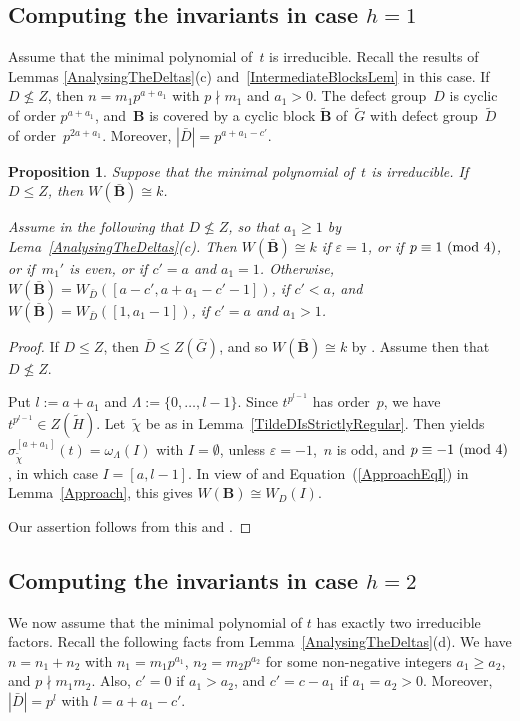 \documentclass[12pt]{amsart}
\newcommand{\bB}{{\mathbf{B}}}
\newtheorem{prop}[thm]{Proposition}
\theoremstyle{theorem}
\theoremstyle{definition}
\theoremstyle{remark}
\begin{document}
\addtocounter{subsection}{4}
\subsection{Computing the invariants in case $h = 1$}
Assume that the minimal polynomial of~$t$ is irreducible. Recall the results of 
Lemmas \ref{AnalysingTheDeltas}(c) and~\ref{IntermediateBlocksLem} in this case. 
If $D \not \leq Z$, then $n = m_1p^{a + a_1}$ with $p \nmid m_1$ and $a_1 > 0$. 
The defect group~$D$ is cyclic of order $p^{a+a_1}$, and~$\bB$ is covered by a 
cyclic block $\tilde{\bB}$ of~$\tilde{G}$ with defect group~$\tilde{D}$ of 
order~$p^{2a+a_1}$. Moreover, $|\bar{D}| = p^{a + a_1 - c'}$.

\addtocounter{thm}{1}
\begin{prop}
\label{Case1Prop}
Suppose that the minimal polynomial of~$t$ is irreducible. If $D \leq Z$, then
$W( \bar{\bB} ) \cong k$.

Assume in the following that $D \not \leq Z$, so that $a_1 \geq 1$ by
{\rm Lema~\ref{AnalysingTheDeltas}(c)}. Then $W( \bar{\bB} ) \cong k$
if $\varepsilon = 1$, or if $p \equiv 1\,\,(\mbox{\rm mod}\,\,4)$, or if~$m_1'$ 
is even, or if $c' = a$ and $a_1 = 1$. Otherwise, 
$W( \bar{\bB} ) = W_{\bar{D}}( [a - c', a + a_1 - c' - 1] )$, if $c' < a$,
and $W( \bar{\bB} ) = W_{\bar{D}}( [1, a_1 - 1] )$, if $c' = a$ and $a_1 > 1$.
\end{prop}
\begin{proof}
If $D \leq Z$, then $\bar{D} \leq Z( \bar{G} )$, and so
$W( \bar{\bB} ) \cong k$ by \cite[Lemma~$3.6$(b)]{HL24}. Assume then that
$D \not\leq Z$.

Put $l := a + a_1$ and $\Lambda := \{ 0, \ldots , l - 1\}$. Since $t^{p^{l -1}}$ 
has order~$p$, we have $t^{p^{l - 1}} \in Z( \tilde{H} )$. Let~$\tilde{\chi}$ be 
as in Lemma~\ref{TildeDIsStrictlyRegular}. Then \cite[Lemma~$4.1.3$]{HL25} 
yields $\sigma_{\tilde{\chi}}^{[a + a_1]}( t ) = \omega_{\Lambda}( I )$ with 
$I = \emptyset$, unless $\varepsilon = -1$,~$n$ is odd, and 
$p \equiv -1\,\,(\mbox{\rm mod}\,\,4)$, in which case $I = [a, l - 1]$. In view 
of \cite[Remark~$2.3.3$]{HL25} and 
Equation~(\ref{ApproachEqI}) in Lemma~\ref{Approach}, this gives 
$W( \bB ) \cong W_{D}( I )$.

Our assertion follows from this and \cite[Lemma~$2.4.2$(c)]{HL25}.
\end{proof}

\addtocounter{subsection}{1}
\subsection{Computing the invariants in case $h = 2$}
We now assume that the minimal polynomial of $t$ has exactly two irreducible 
factors. Recall the following facts from Lemma~\ref{AnalysingTheDeltas}(d). We
have 
$n = n_1 + n_2$ with $n_1 = m_1p^{a_1}$, $n_2 = m_2p^{a_2}$ for some 
non-negative integers $a_1 \geq a_2$, and $p \nmid m_1m_2$. Also, $c' = 0$ if 
$a_1 > a_2$, and $c' = c - a_1$ if $a_1 = a_2 > 0$. Moreover, $|\bar{D}| = p^l$ 
with $l = a + a_1 - c'$.
\end{document}
